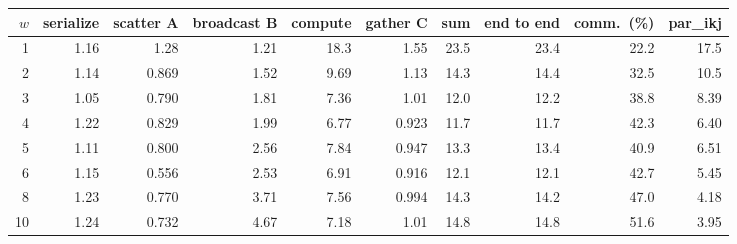 \begin{tabular}{rrrrrrrrrr}
\toprule
$w$ & serialize & scatter A & broadcast B & compute & gather C & sum & end to end & comm.\ (\%) & par\_ikj \\
\midrule
1 & 1.16 & 1.28 & 1.21 & 18.3 & 1.55 & 23.5 & 23.4 & 22.2 & 17.5 \\
2 & 1.14 & 0.869 & 1.52 & 9.69 & 1.13 & 14.3 & 14.4 & 32.5 & 10.5 \\
3 & 1.05 & 0.790 & 1.81 & 7.36 & 1.01 & 12.0 & 12.2 & 38.8 & 8.39 \\
4 & 1.22 & 0.829 & 1.99 & 6.77 & 0.923 & 11.7 & 11.7 & 42.3 & 6.40 \\
5 & 1.11 & 0.800 & 2.56 & 7.84 & 0.947 & 13.3 & 13.4 & 40.9 & 6.51 \\
6 & 1.15 & 0.556 & 2.53 & 6.91 & 0.916 & 12.1 & 12.1 & 42.7 & 5.45 \\
8 & 1.23 & 0.770 & 3.71 & 7.56 & 0.994 & 14.3 & 14.2 & 47.0 & 4.18 \\
10 & 1.24 & 0.732 & 4.67 & 7.18 & 1.01 & 14.8 & 14.8 & 51.6 & 3.95 \\
\bottomrule
\end{tabular}
\par{}
